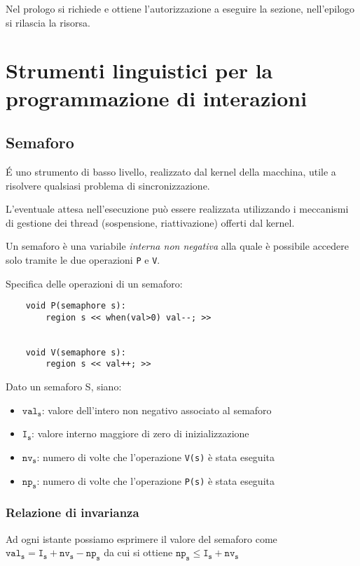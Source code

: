 Nel prologo si richiede e ottiene l'autorizzazione a eseguire la sezione, nell'epilogo si rilascia la risorsa.

\section{Strumenti linguistici per la programmazione di interazioni}

\subsection{Semaforo}
É uno strumento di basso livello, realizzato dal kernel della macchina, utile a risolvere qualsiasi problema di sincronizzazione.

L'eventuale attesa nell'esecuzione può essere realizzata utilizzando i meccanismi di gestione dei thread (sospensione, riattivazione) offerti dal kernel.

Un semaforo è una variabile \textit{interna non negativa} alla quale è possibile accedere solo tramite le due operazioni \texttt{P} e \texttt{V}.

Specifica delle operazioni di un semaforo:
\begin{lstlisting}
    void P(semaphore s):
        region s << when(val>0) val--; >>


    void V(semaphore s):
        region s << val++; >>
\end{lstlisting}

Dato un semaforo S, siano:
\begin{itemize}
    \item $\texttt{val}_\texttt{s}$: valore dell'intero non negativo associato al semaforo
    \item $\texttt{I}_\texttt{s}$: valore interno maggiore di zero di inizializzazione
    \item $\texttt{nv}_\texttt{s}$: numero di volte che l'operazione \texttt{V(s)} è stata eseguita
    \item $\texttt{np}_\texttt{s}$: numero di volte che l'operazione \texttt{P(s)} è stata eseguita
\end{itemize}

\subsubsection{Relazione di invarianza}
Ad ogni istante possiamo esprimere il valore del semaforo come $\texttt{val}_\texttt{s} = \texttt{I}_\texttt{s} + \texttt{nv}_\texttt{s} - \texttt{np}_\texttt{s}$ da cui si ottiene $\texttt{np}_\texttt{s}\le \texttt{I}_\texttt{s}+\texttt{nv}_\texttt{s}$

